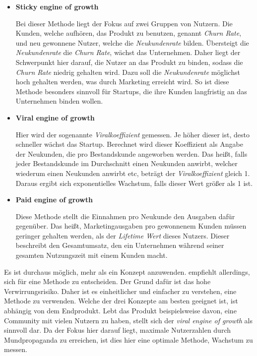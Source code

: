 \begin{itemize}
	\item \textbf{Sticky engine of growth}
	
	Bei dieser Methode liegt der Fokus auf zwei Gruppen von Nutzern. Die Kunden, welche aufhören, das Produkt zu benutzen, genannt \textit{Churn Rate}, und neu gewonnene Nutzer, welche die \textit{Neukundenrate} bilden. Übersteigt die \textit{Neukundenrate} die \textit{Churn Rate}, wächst das Unternehmen. Daher liegt der Schwerpunkt hier darauf, die Nutzer an das Produkt zu binden, sodass die \textit{Churn Rate} niedrig gehalten wird. Dazu soll die \textit{Neukundenrate} möglichst hoch gehalten werden, was durch Marketing erreicht wird. So ist diese Methode besonders sinnvoll für Startups, die ihre Kunden langfristig an das Unternehmen binden wollen.
	\item \textbf{Viral engine of growth}
	
	Hier wird der sogenannte \textit{Viralkoeffizient} gemessen. Je höher dieser ist, desto schneller wächst das Startup. Berechnet wird dieser Koeffizient als Angabe der Neukunden, die pro Bestandskunde angeworben werden. Das heißt, falls jeder Bestandskunde im Durchschnitt einen Neukunden anwirbt, welcher wiederum einen Neukunden anwirbt etc, beträgt der \textit{Viralkoeffizient} gleich 1. Daraus ergibt sich exponentielles Wachstum, falls dieser Wert größer als 1 ist.
	\item \textbf{Paid engine of growth}
	
	Diese Methode stellt die Einnahmen pro Neukunde den Ausgaben dafür gegenüber. Das heißt, Marketingausgaben pro gewonnenem Kunden müssen geringer gehalten werden, als der \textit{Lifetime Wert} dieses Nutzers. Dieser beschreibt den Gesamtumsatz, den ein Unternehmen während seiner gesamten Nutzungszeit mit einem Kunden macht.
\end{itemize}

Es ist durchaus möglich, mehr als ein Konzept anzuwenden. \citeauthor{TheLeanStartup} empfiehlt allerdings, sich für eine Methode zu entscheiden. Der Grund dafür ist das hohe Verwirrungsrisiko. Daher ist es einheitlicher und einfacher zu verstehen, eine Methode zu verwenden. Welche der drei Konzepte am besten geeignet ist, ist abhängig von dem Endprodukt. Lebt das Produkt beispielsweise davon, eine Community mit vielen Nutzern zu haben, stellt sich der \textit{viral engine of growth} als sinnvoll dar. Da der Fokus hier darauf liegt, maximale Nutzerzahlen durch Mundpropaganda zu erreichen, ist dies hier eine optimale Methode, Wachstum zu messen.
\cite{TheLeanStartup}